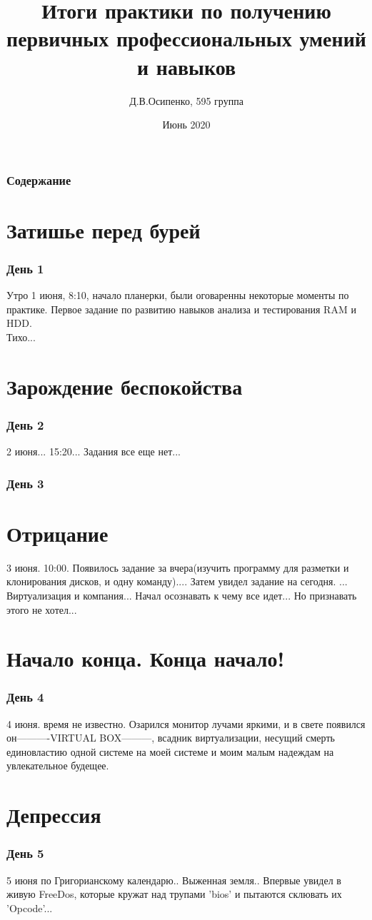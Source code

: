 \documentclass[xcolor=dvipsnames,aspectratio=169,12pt]{beamer}
\title{Итоги практики по получению первичных профессиональных умений и навыков}
\author{Д.В.Осипенко, 595 группа}
\institute{Алтайский госудаственный университет.\\ Институт цифровых технологий, электроники и физики.}
\date{Июнь 2020}
\begin{document}
\frame{\titlepage}

\begin{frame}\frametitle{Содержание}
    \tableofcontents
\end{frame}

\section{Затишье перед бурей}
\begin{frame}\frametitle{День 1}
    Утро 1 июня, 8:10, начало планерки, были оговаренны некоторые моменты по практике. Первое задание по развитию навыков анализа и тестирования RAM и HDD.\\
    Тихо...
\end{frame}

\section{Зарождение беспокойства}
\begin{frame}
    \frametitle{День 2}
    2 июня... 15:20... Задания все еще нет...
\end{frame}
    
\begin{frame}\frametitle{День 3}
    \section{Отрицание}
    3 июня. 10:00. Появилось задание за вчера(изучить программу для разметки и клонирования дисков, и одну команду).... Затем увидел задание на сегодня. ... Виртуализация и компания... Начал осознавать к чему все идет... Но признавать этого не хотел...
\end{frame}

\section{Начало конца. Конца начало!}
\begin{frame}\frametitle{День 4}
    4 июня. время не известно. Озарился монитор лучами яркими, и в свете появился он----------VIRTUAL BOX---------, всадник виртуализации, несущий смерть единовластию одной системе на моей системе и моим малым надеждам на увлекательное будещее.
\end{frame}

\section{Депрессия}
\begin{frame}\frametitle{День 5}
    5 июня по Григорианскому календарю.. Выженная земля.. Впервые увидел в живую FreeDos, которые кружат над трупами 'bios' и пытаются склювать их 'Opcode'...
\end{frame}
\end{document}
